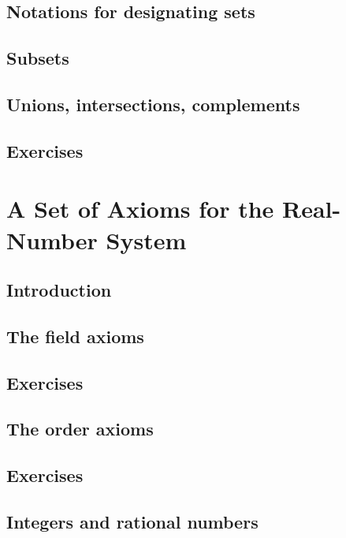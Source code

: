 \documentclass[cn,11pt,chinese]{elegantbook}
\numberwithin{equation}{section}
\begin{document}
\subsection{Notations for designating sets}


\subsection{Subsets}


\subsection{Unions, intersections, complements}



\subsection{Exercises}


\section{A Set of Axioms for the Real-Number System}\label{section00103}


\subsection{Introduction}


\subsection{The field axioms}


\subsection{Exercises}


\subsection{The order axioms}


\subsection{Exercises}


\subsection{Integers and rational numbers}
\end{document}

